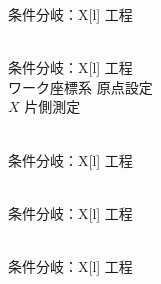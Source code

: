 \clearpage

\begin{multicollongtblr}{条件分岐：\PMKeywayCornerType}{X[l]}
工程\\
\KeywayMilling\\
\end{multicollongtblr}

\begin{multicollongtblr}{条件分岐：\PMAKDToleranceExists}{X[l]}
工程\\
ワーク座標系 原点設定\\
\KeywayCenter$X$ 片側測定\\
\KeywayMilling\\
\end{multicollongtblr}




\begin{multicollongtblr}{条件分岐：\PMDimpleExists}{X[l]}
工程\\
\DimpleMilling\\
\end{multicollongtblr}




\begin{multicollongtblr}{条件分岐：\PMEndFaceOutChamferType}{X[l]}
工程\\
\EndFaceOutChamferMilling\\
\end{multicollongtblr}

\begin{multicollongtblr}{条件分岐：\PMEndFaceInChamferType}{X[l]}
工程\\
\EndFaceInChamferMilling\\
\end{multicollongtblr}




